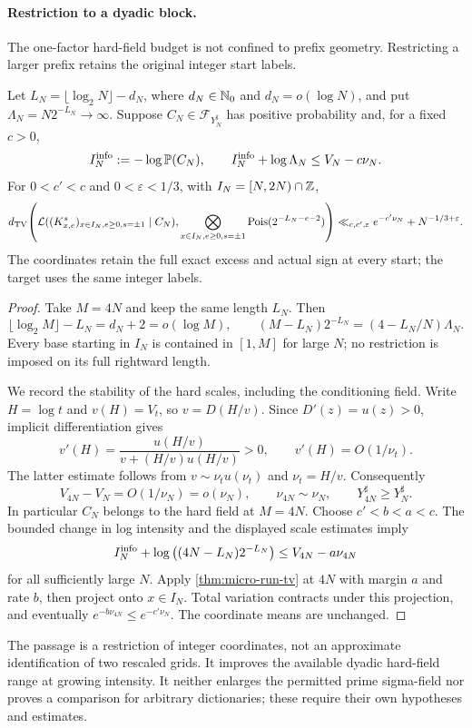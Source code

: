 \paragraph{Restriction to a dyadic block.}
The one-factor hard-field budget is not confined to prefix geometry.
Restricting a larger prefix retains the original integer start labels.

\begin{dyadiccorollary}
\label{cor:dyadic-micro}
Let $L_N=\lfloor\log_2N\rfloor-d_N$, where $d_N\in\mathbb N_0$ and
$d_N=o(\log N)$, and put $\Lambda_N=N2^{-L_N}\to\infty$.
Suppose $C_N\in\mathcal F_{Y_N^\sharp}$ has positive probability and,
for a fixed $c>0$,
\[
 I_N^{\rm info}:=-\log\mathbb P(C_N),\qquad
 I_N^{\rm info}+\log\Lambda_N\le V_N-c\nu_N.
\]
For $0<c'<c$ and $0<\varepsilon<1/3$, with
$I_N=[N,2N)\cap\mathbb Z$,
\[
 d_{\mathrm{TV}}\!\left(
  \mathcal L((K^s_{x,e})_{x\in I_N,e\ge0,s=\pm1}\mid C_N),
  \bigotimes_{x\in I_N,e\ge0,s=\pm1}\operatorname{Pois}(2^{-L_N-e-2})
 \right)
 \ll_{c,c',\varepsilon}e^{-c'\nu_N}+N^{-1/3+\varepsilon}.
\]
The coordinates retain the full exact excess and actual sign at every
start; the target uses the same integer labels.
\end{dyadiccorollary}
\begin{proof}
Take $M=4N$ and keep the same length $L_N$. Then
\[
 \lfloor\log_2M\rfloor-L_N=d_N+2=o(\log M),\qquad
 (M-L_N)2^{-L_N}=(4-L_N/N)\Lambda_N.
\]
Every base starting in $I_N$ is contained in $[1,M]$ for large $N$;
no restriction is imposed on its full rightward length.

We record the stability of the hard scales, including the conditioning
field. Write $H=\log t$ and $v(H)=V_t$, so
$v=D(H/v)$. Since $D'(z)=u(z)>0$, implicit differentiation gives
\[
 v'(H)=\frac{u(H/v)}{v+(H/v)u(H/v)}>0,
 \qquad v'(H)=O(1/\nu_t).
\]
The latter estimate follows from $v\sim\nu_tu(\nu_t)$ and
$\nu_t=H/v$. Consequently
\[
 V_{4N}-V_N=O(1/\nu_N)=o(\nu_N),\qquad
 \nu_{4N}\sim\nu_N,\qquad Y_{4N}^\sharp\ge Y_N^\sharp.
\]
In particular $C_N$ belongs to the hard field at $M=4N$. Choose
$c'<b<a<c$. The bounded change in log intensity and the displayed
scale estimates imply
\[
 I_N^{\rm info}+\log\big((4N-L_N)2^{-L_N}\big)
       \le V_{4N}-a\nu_{4N}
\]
for all sufficiently large $N$. Apply \cref{thm:micro-run-tv} at $4N$
with margin $a$ and rate $b$, then project onto $x\in I_N$.
Total variation contracts under this projection, and eventually
$e^{-b\nu_{4N}}\le e^{-c'\nu_N}$. The coordinate means are unchanged.
\end{proof}
The passage is a restriction of integer coordinates, not an approximate
identification of two rescaled grids. It improves the available dyadic
hard-field range at growing intensity. It neither enlarges the permitted
prime sigma-field nor proves a comparison for arbitrary dictionaries;
these require their own hypotheses and estimates.
